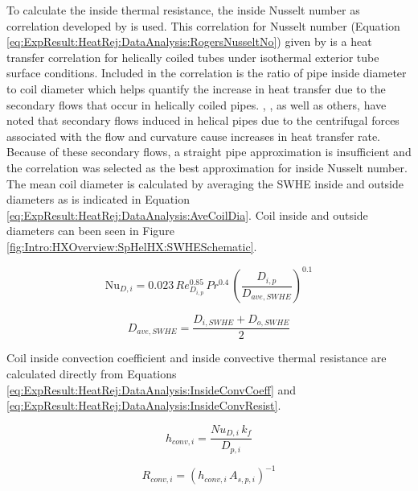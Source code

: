 To calculate the inside thermal resistance, the inside Nusselt number as correlation developed by \cite{RogersMayhew1964} is used. This correlation for Nusselt number (Equation \ref{eq:ExpResult:HeatRej:DataAnalysis:RogersNusseltNo}) given by \cite{RogersMayhew1964} is a heat transfer correlation for helically coiled tubes under isothermal exterior tube surface conditions. Included in the correlation is the ratio of pipe inside diameter to coil diameter which helps quantify the increase in heat transfer due to the secondary flows that occur in helically coiled pipes. \cite{RogersMayhew1964}, \cite{SebanMclaughlin1963}, as well as others, have noted that secondary flows induced in helical pipes due to the centrifugal forces associated with the flow and curvature cause increases in heat transfer rate. Because of these secondary flows, a straight pipe approximation is insufficient and the \cite{RogersMayhew1964} correlation was selected as the best approximation for inside Nusselt number. The mean coil diameter is calculated by averaging the SWHE inside and outside diameters as is indicated in Equation \ref{eq:ExpResult:HeatRej:DataAnalysis:AveCoilDia}. Coil inside and outside diameters can been seen in Figure \ref{fig:Intro:HXOverview:SpHelHX:SWHESchematic}.

	\begin{equation}
		\mbox{Nu}_{D,i}=0.023 \, Re_{D_{i,p}}^{0.85} \, Pr^{0.4} \, \left(\frac{D_{i,p}}{D_{ave,SWHE}}\right)^{0.1}
		\label{eq:ExpResult:HeatRej:DataAnalysis:RogersNusseltNo}
	\end{equation}
	
	\begin{equation}
		D_{ave,SWHE} = \frac{D_{i,SWHE} + D_{o,SWHE}}{2}
		\label{eq:ExpResult:HeatRej:DataAnalysis:AveCoilDia}
	\end{equation}

Coil inside convection coefficient and inside convective thermal resistance are calculated directly from Equations \ref{eq:ExpResult:HeatRej:DataAnalysis:InsideConvCoeff} and \ref{eq:ExpResult:HeatRej:DataAnalysis:InsideConvResist}.
	
	\begin{equation}
		h_{conv,i}=\frac{Nu_{D,i} \, k_f}{D_{p,i}}
		\label{eq:ExpResult:HeatRej:DataAnalysis:InsideConvCoeff}
	\end{equation}

	\begin{equation}
		R_{conv,i}=(h_{conv,i} \, A_{s,p,i})^{-1}
		\label{eq:ExpResult:HeatRej:DataAnalysis:InsideConvResist}
	\end{equation}
	

